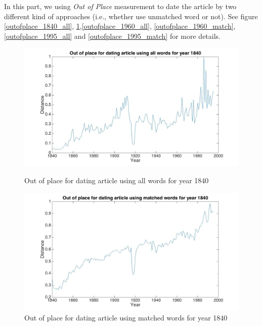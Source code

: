 In this part, we using \emph{Out of Place} measurement to date the article by two different kind of approaches (i.e., whether use unmatched word or not). See figure \ref{outofplace_1840_all}, \ref{outofplace_1840_match},\ref{outofplace_1960_all}, \ref{outofplace_1960_match}, \ref{outofplace_1995_all} and \ref{outofplace_1995_match} for more details.

\begin{figure}[H]
    \begin{minipage}[b]{0.48\linewidth}
        \includegraphics[scale=0.15]{Pictures/date_articles/outofplace/1840_all.jpg}
        \caption{Out of place for dating article using all words for year 1840}
        \label{outofplace_1840_all}
    \end{minipage}\hfill
    \begin{minipage}[b]{0.5\linewidth}
        \includegraphics[scale=0.15]{Pictures/date_articles/outofplace/1840_partial.jpg}
        \caption{Out of place for dating article using matched words for year 1840}
        \label{outofplace_1840_match}
    \end{minipage}\hfill
\end{figure}

